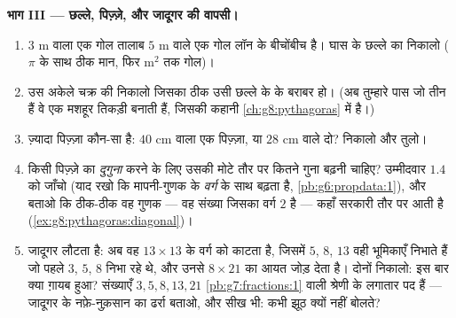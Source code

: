 \begin{problem}[{सप्ताहांत समस्या --- वह मशहूर ``प्रमाण'' कि
$64 = 65$, जिसका भेद क्षेत्रफल और ढलान खोल देते हैं, और मिठाई में
पिज़्ज़े तथा छल्ले}]
\medskip
\noindent\textbf{भाग III --- छल्ले, पिज़्ज़े, और जादूगर की
वापसी।}
\begin{enumerate}[resume]
  \item $3$ m  वाला एक गोल तालाब $5$ m  वाले एक
        गोल लॉन के बीचोंबीच है। घास के छल्ले का  निकालो
        ($\pi$ के साथ ठीक मान, फिर m$^2$ तक गोल)।
  \item उस अकेले चक्र की  निकालो जिसका  ठीक उसी
        छल्ले के  के बराबर हो। (अब तुम्हारे पास जो तीन
         हैं वे एक मशहूर तिकड़ी बनाती हैं, जिसकी कहानी
        \cref{ch:g8:pythagoras} में है।)
  \item ज़्यादा पिज़्ज़ा कौन-सा है: $40$ cm  वाला एक
        पिज़्ज़ा, या $28$ cm  वाले दो? निकालो और तुलो।
  \item किसी पिज़्ज़े का  \emph{दुगुना} करने के लिए उसकी
         मोटे तौर पर कितने गुना बढ़नी चाहिए? उम्मीदवार
        $1.4$ को जाँचो (याद रखो कि  मापनी-गुणक के
        \emph{वर्ग} के साथ बढ़ता है, \cref{pb:g6:propdata:1}),
        और बताओ कि ठीक-ठीक वह गुणक --- वह संख्या जिसका वर्ग $2$
        है --- कहाँ सरकारी तौर पर आती है
        (\cref{ex:g8:pythagoras:diagonal})।
  \item जादूगर लौटता है: अब वह $13 \times 13$ के वर्ग को काटता
        है, जिसमें $5$, $8$, $13$ वही भूमिकाएँ निभाते हैं जो
        पहले $3$, $5$, $8$ निभा रहे थे, और उनसे $8 \times 21$ का
        आयत जोड़ देता है। दोनों  निकालो: इस बार क्या
        ग़ायब हुआ? संख्याएँ $3, 5, 8, 13, 21$
        \cref{pb:g7:fractions:1} वाली श्रेणी के लगातार पद हैं ---
        जादूगर के नफ़े-नुक़सान का ढर्रा बताओ, और सीख भी: 
        कभी झूठ क्यों नहीं बोलते?
\end{enumerate}
\end{problem}
